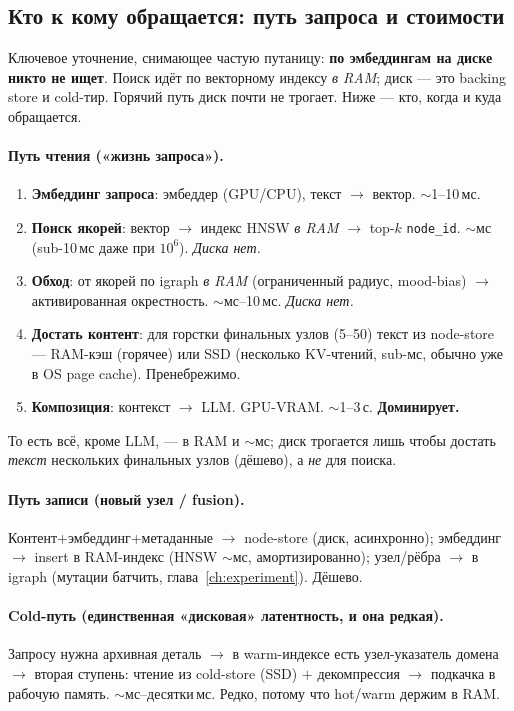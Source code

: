 \subsection{Кто к кому обращается: путь запроса и стоимости}
\label{sec:dataflow}

Ключевое уточнение, снимающее частую путаницу: \textbf{по эмбеддингам на диске никто
не ищет}. Поиск идёт по векторному индексу \emph{в RAM}; диск — это backing store и
cold-тир. Горячий путь диск почти не трогает. Ниже — кто, когда и куда обращается.

\paragraph{Путь чтения («жизнь запроса»).}
\begin{enumerate}\itemsep1pt
\item \textbf{Эмбеддинг запроса}: эмбеддер (GPU/CPU), текст $\to$ вектор. $\sim$1--10\,мс.
\item \textbf{Поиск якорей}: вектор $\to$ индекс HNSW \emph{в RAM} $\to$ top-$k$
\texttt{node\_id}. $\sim$мс (sub-10\,мс даже при $10^6$). \emph{Диска нет.}
\item \textbf{Обход}: от якорей по igraph \emph{в RAM} (ограниченный радиус,
mood-bias) $\to$ активированная окрестность. $\sim$мс--10\,мс. \emph{Диска нет.}
\item \textbf{Достать контент}: для горстки финальных узлов (5--50) текст из
node-store — RAM-кэш (горячее) или SSD (несколько KV-чтений, sub-мс, обычно уже в OS
page cache). Пренебрежимо.
\item \textbf{Композиция}: контекст $\to$ LLM. GPU-VRAM. $\sim$1--3\,с.
\textbf{Доминирует.}
\end{enumerate}
То есть всё, кроме LLM, — в RAM и $\sim$мс; диск трогается лишь чтобы достать
\emph{текст} нескольких финальных узлов (дёшево), а \emph{не} для поиска.

\paragraph{Путь записи (новый узел / fusion).} Контент+эмбеддинг+метаданные $\to$
node-store (диск, асинхронно); эмбеддинг $\to$ insert в RAM-индекс (HNSW $\sim$мс,
амортизированно); узел/рёбра $\to$ в igraph (мутации батчить, глава~\ref{ch:experiment}).
Дёшево.

\paragraph{Cold-путь (единственная «дисковая» латентность, и она редкая).} Запросу
нужна архивная деталь $\to$ в warm-индексе есть узел-указатель домена $\to$ вторая
ступень: чтение из cold-store (SSD) $+$ декомпрессия $\to$ подкачка в рабочую память.
$\sim$мс--десятки\,мс. Редко, потому что hot/warm держим в RAM.

